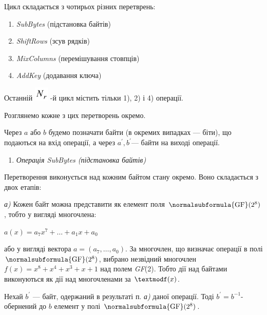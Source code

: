 \bigskip


\bigskip

Цикл складається з чотирьох різних перетврень:

\liststyleWWviiiNumiv
\begin{enumerate}
\item \textit{SubBytes} (підстановка байтів)
\item \textit{ShiftRows} (зсув рядків)
\item \textit{MixColumns }(перемішування стовпців)
\item \textit{AddKey} (додавання ключа)
\end{enumerate}
Останній 
\includegraphics[width=0.2638in,height=0.2638in]{crypt-img/crypt-img329.png}
{}-й цикл містить тільки 1), 2) і 4) операції.

Розглянемо кожне з цих перетворень окремо. 

Через  $a$ або  $b$ будемо позначати байти (в окремих випадках --- біти), що
подаються на вхід операції, а через  ${a}^{'},b^{'}$--- байти на виході
операції.


\bigskip

\liststyleWWviiiNumxxxi
\begin{enumerate}
\item {\itshape
Операція SubBytes (підстановка байтів)}
\end{enumerate}

\bigskip

Перетворення виконується над кожним байтом стану окремо. Воно складається з двох
етапів:

\textit{а)} Кожен байт можна представити як елемент поля 
$\normalsubformula{\text{GF}}(2^8)$, тобто у вигляді многочлена:

{\centering 
$a(x)=a_{7}x^{7}+\dots+a_{1}x+a_0$\par}

або у вигляді вектора  $a=(a_{7},\dots,a_0)$. За
многочлен, що визначає операції в полі 
$\normalsubformula{\text{GF}}(2^8)$, вибрано незвідний многочлен 
$f(x)=x^{8}+x^{4}+x^3+x+1$ над полем \textit{GF}(2). Тобто  дії над
байтами виконуються як дії над многочленами за  $\textmodf(x)$.

Нехай  $b^{'}$ --- байт, одержаний в результаті п. \textit{а)}  даної
операції. Тоді  $b^{'}=b^{-1}$\nobreakdash- обернений до  $b$ елемент у
полі  $\normalsubformula{\text{GF}}(2^8)$. 

